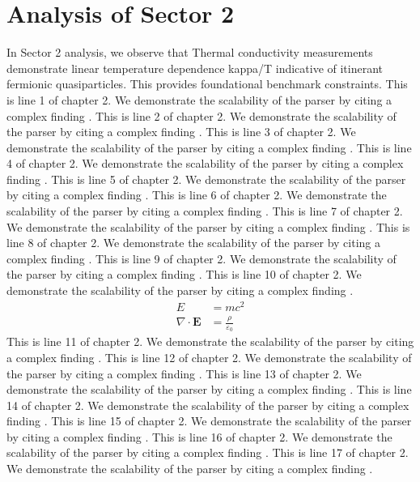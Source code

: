 \chapter{Analysis of Sector 2}

In Sector 2 analysis, we observe that Thermal conductivity measurements demonstrate linear temperature dependence kappa/T indicative of itinerant fermionic quasiparticles. This provides foundational benchmark constraints.
This is line 1 of chapter 2. We demonstrate the scalability of the parser by citing a complex finding \cite{ref2_1}.
This is line 2 of chapter 2. We demonstrate the scalability of the parser by citing a complex finding \cite{ref2_2}.
This is line 3 of chapter 2. We demonstrate the scalability of the parser by citing a complex finding \cite{ref2_3}.
This is line 4 of chapter 2. We demonstrate the scalability of the parser by citing a complex finding \cite{ref2_4}.
This is line 5 of chapter 2. We demonstrate the scalability of the parser by citing a complex finding \cite{ref2_5}.
This is line 6 of chapter 2. We demonstrate the scalability of the parser by citing a complex finding \cite{ref2_6}.
This is line 7 of chapter 2. We demonstrate the scalability of the parser by citing a complex finding \cite{ref2_7}.
This is line 8 of chapter 2. We demonstrate the scalability of the parser by citing a complex finding \cite{ref2_8}.
This is line 9 of chapter 2. We demonstrate the scalability of the parser by citing a complex finding \cite{ref2_9}.
This is line 10 of chapter 2. We demonstrate the scalability of the parser by citing a complex finding \cite{ref2_10}.
\begin{align*}
  E &= mc^2 \\
  \nabla \cdot \mathbf{E} &= \frac{\rho}{\varepsilon_0}
\end{align*}
This is line 11 of chapter 2. We demonstrate the scalability of the parser by citing a complex finding \cite{ref2_11}.
This is line 12 of chapter 2. We demonstrate the scalability of the parser by citing a complex finding \cite{ref2_12}.
This is line 13 of chapter 2. We demonstrate the scalability of the parser by citing a complex finding \cite{ref2_13}.
This is line 14 of chapter 2. We demonstrate the scalability of the parser by citing a complex finding \cite{ref2_14}.
This is line 15 of chapter 2. We demonstrate the scalability of the parser by citing a complex finding \cite{ref2_15}.
This is line 16 of chapter 2. We demonstrate the scalability of the parser by citing a complex finding \cite{ref2_16}.
This is line 17 of chapter 2. We demonstrate the scalability of the parser by citing a complex finding \cite{ref2_17}.
